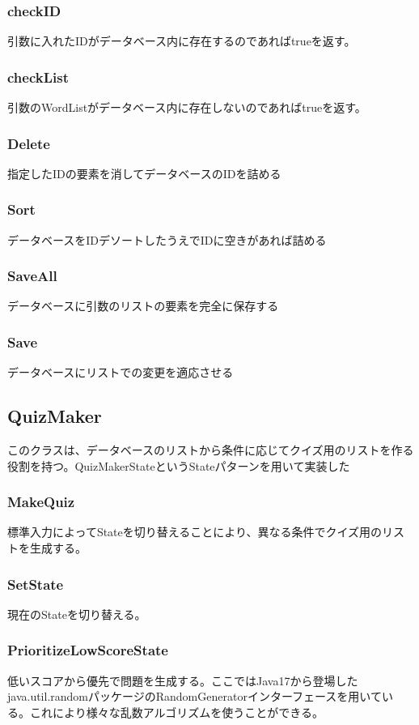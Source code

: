 \documentclass{ltjsarticle}
\begin{document}
\subsubsection{checkID}
引数に入れたIDがデータベース内に存在するのであればtrueを返す。
\subsubsection{checkList}
引数のWordListがデータベース内に存在しないのであればtrueを返す。
\subsubsection{Delete}
指定したIDの要素を消してデータベースのIDを詰める
\subsubsection{Sort}
データベースをIDデソートしたうえでIDに空きがあれば詰める
\subsubsection{SaveAll}
データベースに引数のリストの要素を完全に保存する
\subsubsection{Save}
データベースにリストでの変更を適応させる

\subsection{QuizMaker}
このクラスは、データベースのリストから条件に応じてクイズ用のリストを作る役割を持つ。QuizMakerStateというStateパターンを用いて実装した
\subsubsection{MakeQuiz}
標準入力によってStateを切り替えることにより、異なる条件でクイズ用のリストを生成する。
\subsubsection{SetState}
現在のStateを切り替える。
\subsubsection{PrioritizeLowScoreState}
低いスコアから優先で問題を生成する。ここではJava17から登場したjava.util.randomパッケージのRandomGeneratorインターフェースを用いている。これにより様々な乱数アルゴリズムを使うことができる。
\end{document}
